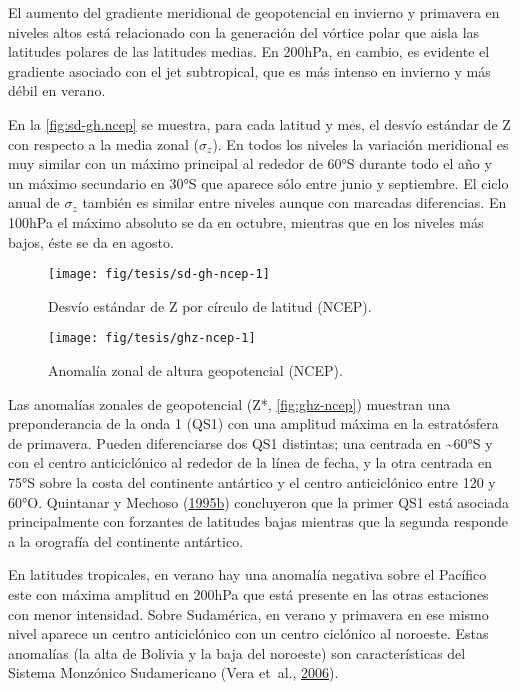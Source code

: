 \documentclass[spanish,a4paper,12pt]{book}
\begin{document}
El aumento del gradiente meridional de geopotencial en invierno y
primavera en niveles altos está relacionado con la generación del
vórtice polar que aisla las latitudes polares de las latitudes medias.
En 200hPa, en cambio, es evidente el gradiente asociado con el jet
subtropical, que es más intenso en invierno y más débil en verano.

En la \autoref{fig:sd-gh.ncep} se muestra, para cada latitud y mes, el
desvío estándar de Z con respecto a la media zonal (\(\sigma_z\)). En
todos los niveles la variación meridional es muy similar con un máximo
principal al rededor de 60°S durante todo el año y un máximo secundario
en 30°S que aparece sólo entre junio y septiembre. El ciclo anual de
\(\sigma_z\) también es similar entre niveles aunque con marcadas
diferencias. En 100hPa el máximo absoluto se da en octubre, mientras que
en los niveles más bajos, éste se da en agosto.

\begin{figure*}
\texttt{[image: fig/tesis/sd-gh-ncep-1]} \caption{Desvío estándar de Z por círculo de latitud (NCEP).}\label{fig:sd-gh-ncep}
\end{figure*}

\begin{landscape}\begin{figure}

{\centering \texttt{[image: fig/tesis/ghz-ncep-1]} 

}

\caption{Anomalía zonal de altura geopotencial (NCEP).}\label{fig:ghz-ncep}
\end{figure}
\end{landscape}

Las anomalías zonales de geopotencial (Z*, \autoref{fig:ghz-ncep})
muestran una preponderancia de la onda 1 (QS1) con una amplitud máxima
en la estratósfera de primavera. Pueden diferenciarse dos QS1 distintas;
una centrada en \textasciitilde{}60°S y con el centro anticiclónico al
rededor de la línea de fecha, y la otra centrada en 75°S sobre la costa
del continente antártico y el centro anticiclónico entre 120 y 60°O.
Quintanar y Mechoso
(\protect\hyperlink{ref-Quintanar1995}{1995}\protect\hyperlink{ref-Quintanar1995}{b})
concluyeron que la primer QS1 está asociada principalmente con forzantes
de latitudes bajas mientras que la segunda responde a la orografía del
continente antártico.

En latitudes tropicales, en verano hay una anomalía negativa sobre el
Pacífico este con máxima amplitud en 200hPa que está presente en las
otras estaciones con menor intensidad. Sobre Sudamérica, en verano y
primavera en ese mismo nivel aparece un centro anticiclónico con un
centro ciclónico al noroeste. Estas anomalías (la alta de Bolivia y la
baja del noroeste) son características del Sistema Monzónico
Sudamericano (Vera et~al., \protect\hyperlink{ref-Vera2006}{2006}).
\end{document}
